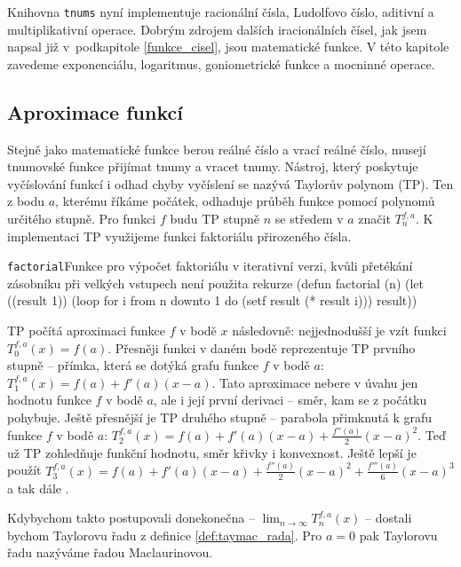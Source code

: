 Knihovna \texttt{tnums} nyní implementuje racionální čísla, Ludolfovo číslo, aditivní a multiplikativní operace. Dobrým zdrojem dalších iracionálních čísel, jak jsem napsal již v~podkapitole \ref{funkce_cisel}, jsou matematické funkce. V této kapitole zavedeme exponenciálu, logaritmus, goniometrické funkce a mocninné operace.

\subsection{Aproximace funkcí}
Stejně jako matematické funkce berou reálné číslo a vrací reálné číslo, musejí tnumovské funkce přijímat tnumy a vracet tnumy. Nástroj, který poskytuje vyčíslování funkcí i odhad chyby vyčíslení se nazývá Taylorův polynom (TP). Ten z bodu $a$, kterému říkáme počátek, odhaduje průběh funkce pomocí polynomů určitého stupně. Pro funkci $f$ budu TP stupně $n$ se středem v $a$ značit $T^{f,a}_n$. K implementaci TP využijeme funkci faktoriálu přirozeného čísla.

\begin{lispcode}{\texttt{factorial}}{Funkce pro výpočet faktoriálu v iterativní verzi, kvůli přetékání zásobníku při velkých vstupech není použita rekurze}
(\textcolor{funkcionalni}{defun} \textcolor{pojmenovan}{factorial} (n)
  (\textcolor{vedlejsi}{let} ((result 1))
    (\textcolor{funkcionalni}{loop} \textcolor{obarvi}{for} i \textcolor{obarvi}{from} n \textcolor{obarvi}{downto} 1
          \textcolor{obarvi}{do} (\textcolor{vedlejsi}{setf} result (\textcolor{matematicke}{*} result i)))
    result))
\end{lispcode}

TP počítá aproximaci funkce $f$ v bodě $x$ následovně: nejjednodušší je vzít funkci $T^{f,a}_0(x) = f(a)$. Přesněji funkci v daném bodě reprezentuje TP prvního stupně -- přímka, která se dotýká grafu funkce $f$ v bodě $a$: $T^{f,a}_1(x) = f(a)+f'(a)(x-a)$. Tato aproximace nebere v úvahu jen hodnotu funkce $f$ v bodě $a$, ale i její první derivaci -- směr, kam se z počátku pohybuje. Ještě přesnější je TP druhého stupně -- parabola přimknutá k grafu funkce $f$ v bodě $a$: $T^{f,a}_2(x) = f(a)+f'(a)(x-a)+\frac{f''(a)}{2}(x-a)^2$. Teď už TP zohledňuje funkční hodnotu, směr křivky i konvexnost. Ještě lepší je použít $T^{f,a}_3(x)=f(a)+f'(a)(x-a)+\frac{f''(a)}{2}(x-a)^2+\frac{f'''(a)}{6}(x-a)^3$ a tak dále \cite{MTTP}.

\begin{remind}
Kdybychom takto postupovali donekonečna -- $\lim_{n\to\infty}T^{f,a}_n(x)$ -- dostali bychom Taylorovu řadu z definice \ref{def:taymac_rada}. Pro $a=0$ pak Taylorovu řadu nazýváme řadou Maclaurinovou.
\end{remind}

